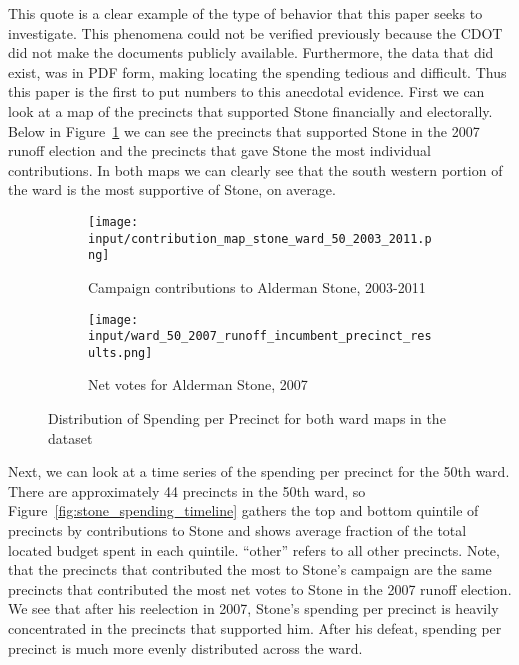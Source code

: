 This quote is a clear example of the type of behavior that this paper seeks to investigate.
This phenomena could not be verified previously because the CDOT did not make the documents publicly available. 
Furthermore, the data that did exist, was in PDF form, making locating the spending tedious and difficult.
Thus this paper is the first to put numbers to this anecdotal evidence.
First we can look at a map of the precincts that supported Stone financially and electorally.
Below in Figure~\ref{fig:stone_support_maps} we can see the precincts that supported Stone in the 2007 runoff election and the precincts that gave Stone the most individual contributions.
In both maps we can clearly see that the south western portion of the ward is the most supportive of Stone, on average.
\begin{figure}[H]
    \centering
    \begin{subfigure}[b]{0.45\textwidth} %
    \texttt{[image: input/contribution\_map\_stone\_ward\_50\_2003\_2011.png]}
    \caption{Campaign contributions to Alderman Stone, 2003-2011}
    \end{subfigure}
    \hfill %
    \begin{subfigure}[b]{0.45\textwidth}
    \texttt{[image: input/ward\_50\_2007\_runoff\_incumbent\_precinct\_results.png]}
    \caption{Net votes for Alderman Stone, 2007}
    \end{subfigure}
    \caption{Distribution of Spending per Precinct for both ward maps in the dataset}
    \label{fig:stone_support_maps}
\end{figure}

Next, we can look at a time series of the spending per precinct for the 50th ward. 
There are approximately 44 precincts in the 50th ward, so Figure~\ref{fig:stone_spending_timeline} gathers the top and bottom quintile of precincts by contributions to Stone and shows average fraction of the total located budget spent in each quintile. 
``other'' refers to all other precincts.
Note, that the precincts that contributed the most to Stone's campaign are the same precincts that contributed the most net votes to Stone in the 2007 runoff election.
We see that after his reelection in 2007, Stone's spending per precinct is heavily concentrated in the precincts that supported him.
After his defeat, spending per precinct is much more evenly distributed across the ward.

